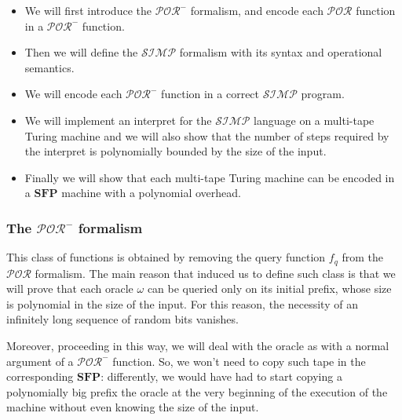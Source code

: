 \documentclass[10pt]{amsart}
\newcommand{\SFP}{\mathbf{SFP}}
\newcommand{\POR}{\mathcal{POR}}
\newcommand{\SIMP}{\mathcal{SIMP}}
\newcommand{\oone}{\omega}
\begin{document}
\begin{itemize}
\item We will first introduce the $\POR^-$ formalism, and encode each $\POR$ function in a $\POR^-$ function.
\item Then we will define the $\SIMP$ formalism with its syntax and operational semantics.
\item We will encode each $\POR^-$ function in a correct $\SIMP$ program.
\item We will implement an interpret for the $\SIMP$ language on a multi-tape Turing machine and we will also show that the number of steps required by the interpret is polynomially bounded by the size of the input.
\item Finally we will show that each multi-tape Turing machine can be encoded in a $\SFP$ machine with a polynomial overhead.
\end{itemize}

\subsubsection{The $\POR^-$ formalism}

This class of functions is obtained by removing the query function $f_q$ from the $\POR$ formalism. The main reason that induced us to define such class is that we will prove that each oracle $\oone$ can be queried only on its initial prefix, whose size is polynomial in the size of the input. For this reason, the necessity of an infinitely long sequence of random bits vanishes.

Moreover, proceeding in this way, we will deal with the oracle as with a normal argument of a $\POR^-$ function. So, we won't need to copy such tape in the corresponding $\SFP$: differently, we would have had to start copying a polynomially big prefix the oracle at the very beginning of the execution of the machine without even knowing the size of the input.
\end{document}
